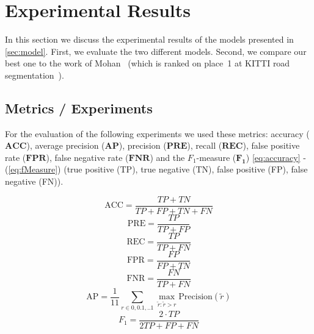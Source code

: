 
\section{Experimental Results}\label{sec:evaluation}

In this section we discuss the experimental results of the models
presented in \cref{sec:model}. First, we evaluate the two different
models. Second, we compare our best one to the work of
Mohan~\cite{Tarel2009} (which is ranked on place~1 at KITTI road
segmentation~\cite{Tarel2009}). 


\subsection{Metrics / Experiments}



For the evaluation of the following experiments we used these metrics:
accuracy ($\mathbf{ACC}$), average precision ($\mathbf{AP}$), precision ($\mathbf{PRE}$),  recall ($\mathbf{REC}$), false positive rate ($\mathbf{FPR}$),  false negative rate ($\mathbf{FNR}$)
and the $F_1$-measure ($\mathbf{F_1}$) \cref{eq:accuracy} - (\ref{eq:fMeasure}) (true positive (TP), true negative (TN), false positive (FP), false negative (FN)). 

\begin{equation} \label{eq:accuracy}
\text{ACC} = \frac{TP + TN}{TP + FP + TN + FN}
\end{equation}
\begin{equation} \label{eq:precision}
\text{PRE} = \frac{TP}{TP + FP}
\end{equation}
\begin{equation} \label{eq:recall}
\text{REC} = \frac{TP}{TP + FN}
\end{equation}
\begin{equation} \label{eq:fpr}
\text{FPR} = \frac{FP}{FP + TN}
\end{equation}
\begin{equation} \label{eq:fnr}
\text{FNR} = \frac{FN}{TP+ FN}
\end{equation}
\begin{equation} \label{eq:ap}
\text{AP} = \frac{1}{11} \displaystyle\sum_{r \in 0,0.1,..1} \max_{\tilde{r}: \tilde{r} > r} \text{Precision}(\tilde{r})
\end{equation}
\begin{equation} \label{eq:fMeasure}
F_1= \frac{2 \cdot TP}{2TP +FP +FN}
\end{equation}

